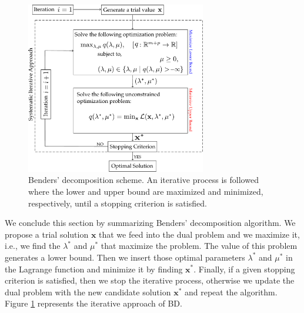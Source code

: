\begin{figure}[H]
\centering
\includegraphics[width=0.7\textwidth]{Figures/BDScheme.pdf} 
\caption{Benders' decomposition scheme. An iterative process is followed where the lower and upper bound are maximized and minimized, respectively, until a stopping criterion is satisfied.}
\label{fig:BDScheme}
\end{figure}
We conclude this section by summarizing Benders' decomposition algorithm. We propose a trial solution $\mathbf{x}$ that we feed into the dual problem and we maximize it, i.e., we find the $\lambda^{*}$ and $\mu^{*}$ that maximize the problem. The value of this problem generates a lower bound. Then we insert those optimal parameters $\lambda^{*}$ and $\mu^{*}$ in the Lagrange function and minimize it by finding $\mathbf{x}^{*}$. Finally, if a given stopping criterion is satisfied, then we stop the iterative process, otherwise we update the dual problem with the new candidate solution $\mathbf{x}^{*}$ and repeat the algorithm. Figure \ref{fig:BDScheme} represents the iterative approach of BD.
